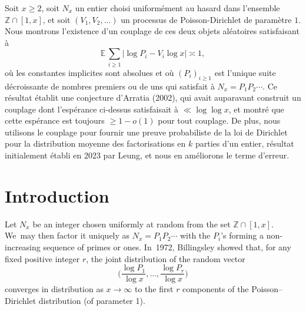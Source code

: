 \documentclass[JEP,XML,SOM,Unicode,published]{cedram}
\newcommand{\ZZ}{\mathbb{Z}}
\newcommand{\bgg}{\Big}
\theoremstyle{plain}
\theoremstyle{definition}
\begin{document}


\begin{altabstract}
Soit $x\ge2$, soit $N_x$ un entier choisi uniformément au hasard dans l'ensemble $\mathbb{Z} \cap [1, x]$, et soit $(V_1, V_2, \ldots)$ un processus de Poisson-Dirichlet de paramètre $1$. Nous montrons l'existence d'un couplage de ces deux objets aléatoires satisfaisant à
\[
\mathbb{E}\, \sum_{i \ge 1} \big|{\log P_i- V_i\log x}\big| \asymp 1,
\]
où les constantes implicites sont absolues et où $(P_i)_{i \ge 1}$ est l'unique suite décroissante de nombres premiers ou de uns qui satisfait à $N_x = P_1P_2 \cdots$. Ce résultat établit une conjecture d'Arratia (2002), qui avait auparavant construit un couplage dont l'espérance ci-dessus satisfaisait à $\ll\log\!\log x$, et montré que cette espérance est toujours $\ge 1-o(1)$ pour tout couplage. De plus, nous utilisons le couplage pour fournir une preuve probabiliste de la loi de Dirichlet pour la distribution moyenne des factorisations en $k$ parties d'un entier, résultat initialement établi en 2023 par Leung, et nous en améliorons le terme d'erreur.
\end{altabstract}

\maketitle
\tableofcontents
\mainmatter

\section{Introduction}
\label{sec:intro}

Let $N_x$ be an integer chosen uniformly at random from the set $\ZZ \cap [1, x]$. We~may then factor it uniquely as $N_x = P_1P_2 \cdots$ with the $P_i$'s forming a non-increasing sequence of primes or ones. In~1972, Billingsley \cite{Bill72} showed that, for any fixed positive integer $r$, the joint distribution of the random vector
\[
\bgg(\frac{\log P_1}{\log x}, \ldots, \frac{\log P_r}{\log x}\bgg)
\]
converges in distribution as $x \to \infty$ to the first $r$ components of the Poisson--Dirichlet distribution (of parameter 1).
\end{document}
